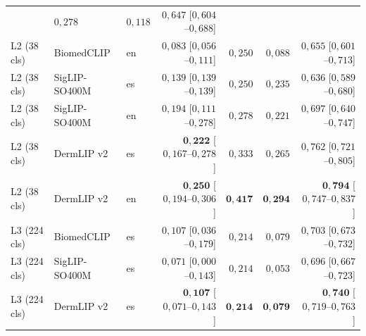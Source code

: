 \begin{table}[htbp]
\begin{tabular}{lllrrrr}
                                  & $0{,}278$
                                  & $0{,}118$
                                  & $0{,}647$ [$0{,}604$--$0{,}688$] \\
L2 (38 cls)  & BiomedCLIP    & en & $0{,}083$ [$0{,}056$--$0{,}111$]
                                  & $0{,}250$
                                  & $0{,}088$
                                  & $0{,}655$ [$0{,}601$--$0{,}713$] \\
L2 (38 cls)  & SigLIP-SO400M & es & $0{,}139$ [$0{,}139$--$0{,}139$]
                                  & $0{,}250$
                                  & $0{,}235$
                                  & $0{,}636$ [$0{,}589$--$0{,}680$] \\
L2 (38 cls)  & SigLIP-SO400M & en & $0{,}194$ [$0{,}111$--$0{,}278$]
                                  & $0{,}278$
                                  & $0{,}221$
                                  & $0{,}697$ [$0{,}640$--$0{,}747$] \\
L2 (38 cls)  & DermLIP v2    & es & $\mathbf{0{,}222}$ [$0{,}167$--$0{,}278$]
                                  & $0{,}333$
                                  & $0{,}265$
                                  & $0{,}762$ [$0{,}721$--$0{,}805$] \\
L2 (38 cls)  & DermLIP v2    & en & $\mathbf{0{,}250}$ [$0{,}194$--$0{,}306$]
                                  & $\mathbf{0{,}417}$
                                  & $\mathbf{0{,}294}$
                                  & $\mathbf{0{,}794}$ [$0{,}747$--$0{,}837$] \\
\hline
L3 (224 cls) & BiomedCLIP    & es & $0{,}107$ [$0{,}036$--$0{,}179$]
                                  & $0{,}214$
                                  & $0{,}079$
                                  & $0{,}703$ [$0{,}673$--$0{,}732$] \\
L3 (224 cls) & SigLIP-SO400M & es & $0{,}071$ [$0{,}000$--$0{,}143$]
                                  & $0{,}214$
                                  & $0{,}053$
                                  & $0{,}696$ [$0{,}667$--$0{,}723$] \\
L3 (224 cls) & DermLIP v2    & es & $\mathbf{0{,}107}$ [$0{,}071$--$0{,}143$]
                                  & $\mathbf{0{,}214}$
                                  & $\mathbf{0{,}079}$
                                  & $\mathbf{0{,}740}$ [$0{,}719$--$0{,}763$] \\
\hline
\end{tabular}
\end{table}

